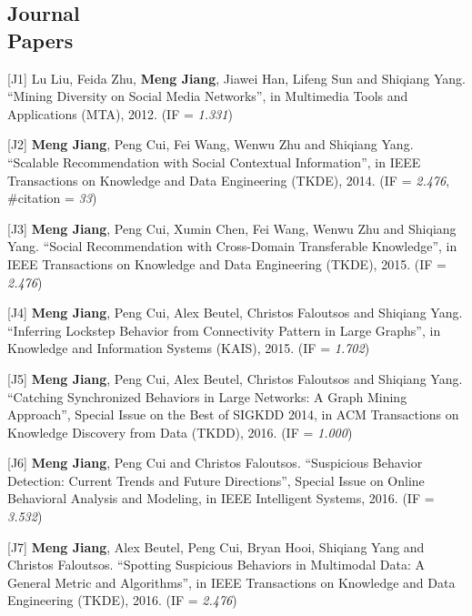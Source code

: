 \documentclass[margin, 10pt]{res}
\begin{document}
\begin{resume}

\section{Journal \\ Papers}

[J1] Lu Liu, Feida Zhu, \textbf{Meng Jiang}, Jiawei Han, Lifeng Sun and Shiqiang Yang. ``Mining Diversity on Social Media Networks'', in Multimedia Tools and Applications (MTA), 2012. (IF = \textit{1.331})

[J2] \textbf{Meng Jiang}, Peng Cui, Fei Wang, Wenwu Zhu and Shiqiang Yang. ``Scalable Recommendation with Social Contextual Information'', in IEEE Transactions on Knowledge and Data Engineering (TKDE), 2014. (IF = \textit{2.476}, \#citation = \textit{33})

[J3] \textbf{Meng Jiang}, Peng Cui, Xumin Chen, Fei Wang, Wenwu Zhu and Shiqiang Yang. ``Social Recommendation with Cross-Domain Transferable Knowledge'', in IEEE Transactions on Knowledge and Data Engineering (TKDE), 2015. (IF = \textit{2.476})

[J4] \textbf{Meng Jiang}, Peng Cui, Alex Beutel, Christos Faloutsos and Shiqiang Yang. ``Inferring Lockstep Behavior from Connectivity Pattern in Large Graphs'', in Knowledge and Information Systems (KAIS), 2015. (IF = \textit{1.702})

[J5] \textbf{Meng Jiang}, Peng Cui, Alex Beutel, Christos Faloutsos and Shiqiang Yang. ``Catching Synchronized Behaviors in Large Networks: A Graph Mining Approach'', Special Issue on the Best of SIGKDD 2014, in ACM Transactions on Knowledge Discovery from Data (TKDD), 2016. (IF = \textit{1.000})

[J6] \textbf{Meng Jiang}, Peng Cui and Christos Faloutsos. ``Suspicious Behavior Detection: Current Trends and Future Directions'', Special Issue on Online Behavioral Analysis and Modeling, in IEEE Intelligent Systems, 2016. (IF = \textit{3.532})

[J7] \textbf{Meng Jiang}, Alex Beutel, Peng Cui, Bryan Hooi, Shiqiang Yang and Christos Faloutsos. ``Spotting Suspicious Behaviors in Multimodal Data: A General Metric and Algorithms'', in IEEE Transactions on Knowledge and Data Engineering (TKDE), 2016. (IF = \textit{2.476})



\end{resume}
\end{document}
